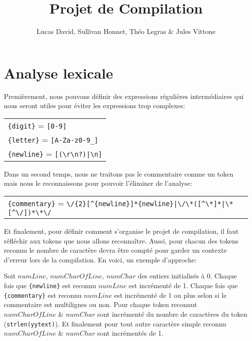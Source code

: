 \documentclass[12pt,a4paper]{article}
\begin{document}
\title{\bfseries Projet de Compilation}
\author{Lucas David, Sullivan Honnet, Théo Legras \& Jules Vittone}
\date{}
\maketitle

\part{Analyse lexicale}

Premièrement, nous pouvons définir des expressions régulières intermédiaires qui nous seront utiles pour éviter les expressions trop complexes:

\begin{tabular}{l}
    \verb!{digit}!   = \verb![0-9]!        \tabularnewline
    \verb!{letter}!  = \verb![A-Za-z0-9_]! \tabularnewline
    \verb!{newline}! = \verb![(\r\n?)|\n]! \tabularnewline
\end{tabular}

Dans un second temps, nous ne traitons pas le commentaire comme un token mais nous le reconnaissons pour pouvoir l'éliminer de l'analyse:

\begin{tabular}{l}
\verb!{commentary}! = \verb!\/{2}[^{newline}]*{newline}|\/\*([^\*]*|\*[^\/])*\*\/!
\end{tabular}


Et finalement, pour définir comment s'organise le projet de compilation, il faut réfléchir aux tokens que nous allons reconnaître. Aussi, pour chacun des tokens reconnu le nombre de caractère devra être compté pour garder un contexte d'erreur lors de la compilation. En voici, un exemple d'approche:

Soit $numLine$, $numCharOfLine$, $numChar$ des entiers initialisés à 0. \newline
Chaque fois que \verb!{newline}! est reconnu $numLine$ est incrémenté de 1. \newline
Chaque fois que \verb!{commentary}! est reconnu $numLine$ est incrémenté de 1 ou plus selon si le commentaire est multilignes ou non. \newline
Pour chaque token reconnut $numCharOfLine$ \& $numChar$ sont incrémenté du nombre de caractères du token (\verb|strlen(yytext)|). \newline
Et finalement pour tout autre caractère simple reconnu $numCharOfLine$ \& $numChar$ sont incrémentés de 1.

\newpage
\end{document}
